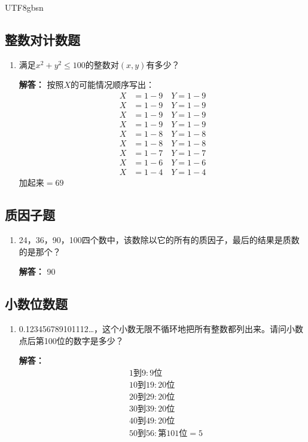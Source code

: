 \documentclass[12pt]{article}
\begin{document}
\begin{CJK*}{UTF8}{gbsn}
\subsection{整数对计数题}
\begin{enumerate}
    \item 满足$x^2 + y^2 \leq 100$的整数对$(x,y)$有多少？
    
    \textbf{解答：} 按照$X$的可能情况顺序写出：
    \begin{align*}
        X &= 1-9 \quad Y = 1-9 \\
        X &= 1-9 \quad Y = 1-9 \\
        X &= 1-9 \quad Y = 1-9 \\
        X &= 1-9 \quad Y = 1-9 \\
        X &= 1-8 \quad Y = 1-8 \\
        X &= 1-8 \quad Y = 1-8 \\
        X &= 1-7 \quad Y = 1-7 \\
        X &= 1-6 \quad Y = 1-6 \\
        X &= 1-4 \quad Y = 1-4
    \end{align*}
    加起来$= 69$
\end{enumerate}

\subsection{质因子题}
\begin{enumerate}
    \item 24，36，90，100四个数中，该数除以它的所有的质因子，最后的结果是质数的是那个？
    
    \textbf{解答：} 90
\end{enumerate}

\subsection{小数位数题}
\begin{enumerate}
    \item 0.123456789101112…，这个小数无限不循环地把所有整数都列出来。请问小数点后第100位的数字是多少？
    
    \textbf{解答：}
    \begin{align*}
        &1 \text{到} 9: \text{9位} \\
        &10 \text{到} 19: \text{20位} \\
        &20 \text{到} 29: \text{20位} \\
        &30 \text{到} 39: \text{20位} \\
        &40 \text{到} 49: \text{20位} \\
        &50 \text{到} 56: \text{第101位} = 5
    \end{align*}
\end{enumerate}


\end{CJK*}
\end{document}
